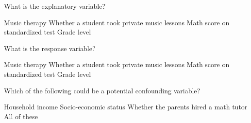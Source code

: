 \documentclass{article}
\begin{document}
\begin{mcquestions}
		\question What is the explanatory variable?
		\begin{mcanswerslist}
			\answer Music therapy
			\answer[correct] Whether a student took private music lessons
			\answer Math score on standardized test
			\answer Grade level
		\end{mcanswerslist}
		
		\question[follow] What is the response variable?
		\begin{mcanswerslist}
			\answer Music therapy
			\answer Whether a student took private music lessons
			\answer[correct] Math score on standardized test
			\answer Grade level
		\end{mcanswerslist}
		
		
		\question[follow] Which of the following could be a potential confounding variable?
		\begin{mcanswerslist}
			\answer Household income
			\answer Socio-economic status
			\answer Whether the parents hired a math tutor
			\answer[correct] All of these
		\end{mcanswerslist}
	\end{mcquestions}
\end{document}

